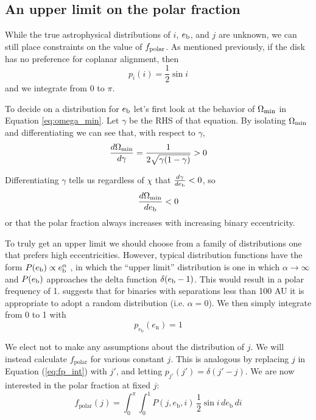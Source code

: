 \documentclass[twocolumn]{aastex631}
\begin{document}
\subsection{An upper limit on the polar fraction}
\label{subsec:fp_limit}
While the true astrophysical distributions of $i$, $e_{\rm b}$, and $j$ are unknown, we can still place constraints on the value of $f_{\rm polar}$.
As mentioned previously, if the disk has no preference for coplanar alignment, then
\begin{equation}
    p_i(i) = \frac{1}{2} \sin{i}
\end{equation}
and we integrate from $0$ to $\pi$.


To decide on a distribution for $e_{\rm b}$ let's first look at the behavior of $\Omega_{\rm min}$ in Equation \ref{eq:omega_min}. Let $\gamma$
be the RHS of that equation. By isolating $\Omega_{\rm min}$ and differentiating we can see that, with respect to $\gamma$,
\begin{equation}
    \frac{d\Omega_{\rm min}}{d \gamma} = \frac{1}{2\sqrt{ \gamma (1 - \gamma)}} > 0
\end{equation}

Differentiating $\gamma$ tells us regardless of $\chi$ that $\frac{d\gamma}{de_{\rm b}} < 0$, so
\begin{equation}
    \frac{d\Omega_{\rm min}}{de_{\rm b}} < 0
\end{equation}
or that the polar fraction always increases with increasing binary eccentricity.


To truly get an upper limit we should choose from a family of distributions one that prefers high eccentricities. However, typical distribution
functions have the form $P(e_{\rm b}) \propto e_{\rm b}^\alpha$ \citep[e.g.][]{hwang2022,ceppi2024}, in which the ``upper limit'' distribution
is one in which $\alpha \rightarrow \infty$ and $P(e_{\rm b})$ approaches the delta function $\delta(e_{\rm b} - 1)$. This would result in a polar frequency
of 1. \citet{hwang2022} suggests that for binaries with separations less than 100 AU it is appropriate to adopt a random distribution (i.e. $\alpha=0$). We then simply
integrate from 0 to 1 with
\begin{equation}
    p_{e_\text{b}}(e_\text{n}) = 1
\end{equation}

We elect not to make any assumptions about the distribution of $j$. We will instead calculate $f_\text{polar}$ for various constant $j$. This is analogous by replacing $j$ in Equation (\ref{eq:fp_int}) with $j'$, and letting $p_{j'}(j') = \delta(j'-j)$. We are now interested in the polar fraction at fixed $j$:
\begin{equation}
    f_\text{polar}(j) = \int_{0}^{\pi} \int_{0}^{1} P(j,e_\text{b},i)\, \frac{1}{2} \sin{i}\,de_\text{b}\,di
\end{equation}
\end{document}
